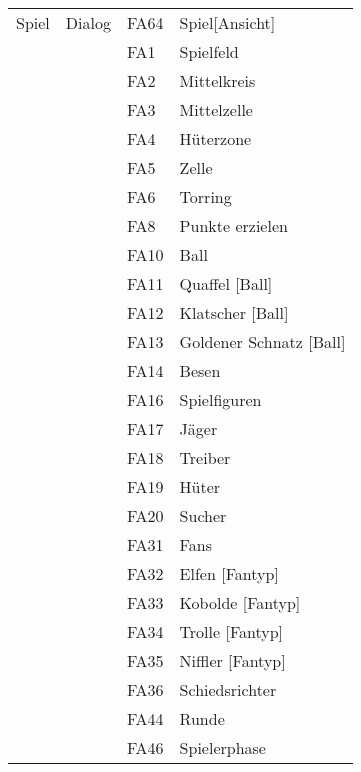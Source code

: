 \begin{figure}[H]
    \centering
    \begin{tabular}{|p{} p{} p{} p{}|}
        \hline
        Spiel & Dialog & FA64 & Spiel[Ansicht]\\
        & & FA1 & Spielfeld\\
        & & FA2 & Mittelkreis\\
        & & FA3 & Mittelzelle\\
        & & FA4 & Hüterzone\\
        & & FA5 & Zelle\\
        & & FA6 & Torring\\
        & & FA8 & Punkte erzielen\\
        & & FA10 & Ball\\
        & & FA11 & Quaffel [Ball]\\
        & & FA12 & Klatscher [Ball]\\
        & & FA13 & Goldener Schnatz [Ball]\\
        & & FA14 & Besen\\
        & & FA16 & Spielfiguren\\
        & & FA17 & Jäger\\
        & & FA18 & Treiber\\
        & & FA19 & Hüter\\
        & & FA20 & Sucher\\
        & & FA31 & Fans\\
        & & FA32 & Elfen [Fantyp]\\
        & & FA33 & Kobolde [Fantyp]\\
        & & FA34 & Trolle [Fantyp]\\
        & & FA35 & Niffler [Fantyp]\\
        & & FA36 & Schiedsrichter\\
        & & FA44 & Runde\\
        & & FA46 & Spielerphase\\\hline
    \end{tabular}
\end{figure}


